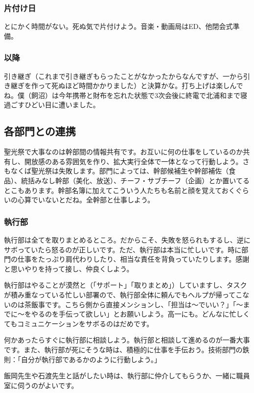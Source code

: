 \documentclass[dvipdfmx,jb5]{jarticle}
\begin{document}
\subsubsection{片付け日}
とにかく時間がない。死ぬ気で片付けよう。音楽・動画局はED、他閉会式準備。

\subsubsection{以降}
引き継ぎ（これまで引き継ぎもらったことがなかったからなんですが、一から引き継ぎを作って死ぬほど時間かかりました）と決算かな。打ち上げは楽しんでね。僕（飼沼）は今年携帯と財布を忘れた状態で3次会後に終電で北浦和まで寝過ごすひどい目に遭いました。

\subsection{各部門との連携}
聖光祭で大事なのは幹部間の情報共有です。お互いに何の仕事をしているのか共有し、開放感のある雰囲気を作り、拡大実行全体で一体となって行動しよう。さもなくば聖光祭は失敗します。部門によっては、幹部候補生や幹部補佐（食品）、統括みなし幹部（美化、放送）、チーフ・サブチーフ（企画）とか置いてるとこもあります。幹部名簿に加えてこういう人たちも名前と顔を覚えておくぐらいの心算でいないとだね。全幹部と仕事しよう。

\subsubsection{執行部}
執行部は全てを取りまとめるところ。だからこそ、失敗を怒られもするし、逆にサボっていたら怒るのが正しいです。ただ、執行部は本当に忙しいです。時に部門の仕事をたっぷり肩代わりしたり、相当な責任を背負っていたりします。感謝と思いやりを持って接し、仲良くしよう。

執行部はやることが漠然と（「サポート」「取りまとめ」）していますし、タスクが積み重なっている忙しい部署ので、執行部全体に頼んでもヘルプが帰ってこないのは茶飯事です。こちら側から直接メンションし、「担当は〜でいい？」「〜までに〜をやるのを手伝って欲しい」とお願いしよう。高一にも。どんなに忙しくてもコミュニケーションをサボるのはだめです。

何かあったらすぐに執行部に相談しよう。執行部と相談して進めるのが一番大事です。また、執行部が死にそうな時は、積極的に仕事を手伝おう。技術部門の鉄則：「自分が執行部であるかのように行動しよう。」

飯岡先生や石渡先生と話がしたい時は、執行部に仲介してもらうか、一緒に職員室に伺うのがよいです。
\end{document}
